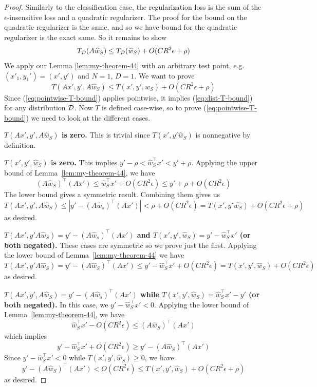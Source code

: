 \documentclass[english]{article}
\theoremstyle{plain}
\begin{document}
\begin{proof}
Similarly to the classification case, the regularization loss is the
sum of the $\epsilon$-insensitive loss and a quadratic regularizer.
The proof for the bound on the quadratic regularizer is the same,
and so we have bound for the quadratic regularizer is the exact same.
So it remains to show
\begin{equation}
T_{{\cal D}}(A\widehat{w}_{S})\leq T_{{\cal D}}(\widehat{w}_{S})+O(CR^{2}\epsilon+\rho)\label{eq:dist-T-bound}
\end{equation}
We apply our Lemma \ref{lem:my-theorem-44} with an arbitrary
test point, e.g. $(x'_{1},y_{1}')=(x',y')$ and $N=1$, $D=1$. We
want to prove
\begin{equation}
T(Ax',y',A\widehat{w}_{S})\leq T(x',y',\widehat{w}_{S})+O(CR^{2}\epsilon+\rho)\label{eq:pointwise-T-bound}
\end{equation}
Since (\ref{eq:pointwise-T-bound}) applies pointwise, it implies
(\ref{eq:dist-T-bound}) for any distribution ${\cal D}$. Now $T$
is defined case-wise, so to prove (\ref{eq:pointwise-T-bound}) we
need to look at the different cases.

\textbf{$T(Ax',y',A\widehat{w}_{S})$ is zero.} This is trivial since
$T(x',y'\widehat{w}_{S})$ is nonnegative by definition.

\textbf{$T(x',y',\widehat{w}_{S})$ is zero.} This implies $y'-\rho<\widehat{w}_{S}^{\top}x'<y'+\rho$.
Applying the upper bound of Lemma~\ref{lem:my-theorem-44},
we have
\[
\left(A\widehat{w}_{S}\right)^{\top}\left(Ax'\right)\leq\widehat{w}_{S}^{\top}x'+O(CR^{2}\epsilon)\leq y'+\rho+O(CR^{2}\epsilon)
\]
The lower bound gives a symmetric result. Combining them gives us
\[
T(Ax',y',A\widehat{w}_{S})\leq\left|y'-\left(A\widehat{w}_{s}\right)^{\top}\left(Ax'\right)\right|<\rho+O(CR^{2}\epsilon)=T(x',y'\widehat{w_{S}})+O(CR^{2}\epsilon+\rho)
\]
as desired.

\textbf{$T(Ax',y'A\widehat{w}_{S})=y'-\left(A\widehat{w}_{s}\right)^{\top}\left(Ax'\right)$
and $T(x',y',\widehat{w}_{S})=y'-\widehat{w}_{S}^{\top}x'$ (or both
negated).} These cases are symmetric so we prove just the first. Applying
the lower bound of Lemma~\ref{lem:my-theorem-44} we have
\[
T(Ax',y'A\widehat{w}_{S})=y'-\left(A\widehat{w}_{S}\right)^{\top}\left(Ax'\right)\leq y'-\widehat{w}_{S}^{\top}x'+O(CR^{2}\epsilon)=T(x',y',\widehat{w}_{S})+O(CR^{2}\epsilon)
\]
as desired.

\textbf{$T(Ax',y',A\widehat{w}_{S})=y'-\left(A\widehat{w}_{s}\right)^{\top}\left(Ax'\right)$
while $T(x',y',\widehat{w}_{S})=\widehat{w}_{S}^{\top}x'-y'$ (or
both negated).} In this case, we $y'-\widehat{w}_{S}^{\top}x'<0$.
Applying the lower bound of Lemma~\ref{lem:my-theorem-44},
we have
\[
\widehat{w}_{S}^{\top}x'-O(CR^{2}\epsilon)\leq\left(A\widehat{w}_{S}\right)^{\top}\left(Ax'\right)
\]
which implies
\[
y'-\widehat{w}_{S}^{\top}x'+O(CR^{2}\epsilon)\geq y'-\left(A\widehat{w}_{S}\right)^{\top}\left(Ax'\right)
\]
Since $y'-\widehat{w}_{S}^{\top}x'<0$ while $T(x',y',\widehat{w}_{S})\geq0$,
we have
\[
y'-\left(A\widehat{w}_{S}\right)^{\top}\left(Ax'\right)<O(CR^{2}\epsilon)\leq T(x',y',\widehat{w}_{S})+O(CR^{2}\epsilon+\rho)
\]
as desired.
\end{proof}
\end{document}
